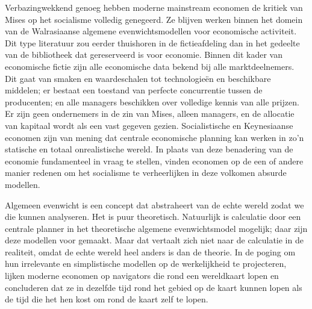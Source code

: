 Verbazingwekkend genoeg hebben moderne mainstream economen de kritiek van Mises op het socialisme volledig genegeerd. Ze blijven werken binnen het domein van de Walrasiaanse algemene evenwichtsmodellen voor economische activiteit. Dit type literatuur zou eerder thuishoren in de fictieafdeling dan in het gedeelte van de bibliotheek dat gereserveerd is voor economie. Binnen dit kader van economische fictie zijn alle economische data bekend bij alle marktdeelnemers. Dit gaat van smaken en waardeschalen tot technologieën en beschikbare middelen; er bestaat een toestand van perfecte concurrentie tussen de producenten; en alle managers beschikken over volledige kennis van alle prijzen. Er zijn geen ondernemers in de zin van Mises, alleen managers, en de allocatie van kapitaal wordt als een vast gegeven gezien. Socialistische en Keynesiaanse economen zijn van mening dat centrale economische planning kan werken in zo'n statische en totaal onrealistische wereld. In plaats van deze benadering van de economie fundamenteel in vraag te stellen, vinden economen op de een of andere manier redenen om het socialisme te verheerlijken in deze volkomen absurde modellen.

Algemeen evenwicht is een concept dat abstraheert van de echte wereld zodat we die kunnen analyseren. Het is puur theoretisch. Natuurlijk is calculatie door een centrale planner in het theoretische algemene evenwichtsmodel mogelijk; daar zijn deze modellen voor gemaakt. Maar dat vertaalt zich niet naar de calculatie in de realiteit, omdat de echte wereld heel anders is dan de theorie. In de poging om hun irrelevante en simplistische modellen op de werkelijkheid te projecteren, lijken moderne economen op navigators die rond een wereldkaart lopen en concluderen dat ze in dezelfde tijd rond het gebied op de kaart kunnen lopen als de tijd die het hen kost om rond de kaart zelf te lopen.

